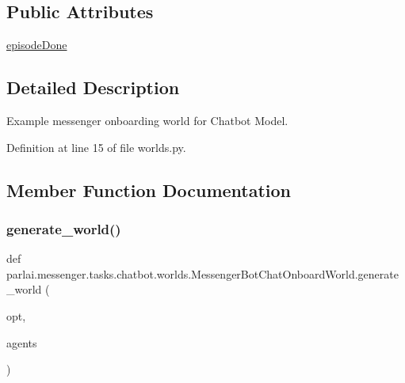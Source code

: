 \subsection*{Public Attributes}
\begin{DoxyCompactItemize}
\item 
\hyperlink{classparlai_1_1messenger_1_1tasks_1_1chatbot_1_1worlds_1_1MessengerBotChatOnboardWorld_ab096cda8cc21f3a5e7f812852e7c0af6}{episode\+Done}
\end{DoxyCompactItemize}


\subsection{Detailed Description}
\begin{DoxyVerb}Example messenger onboarding world for Chatbot Model.\end{DoxyVerb}
 

Definition at line 15 of file worlds.\+py.



\subsection{Member Function Documentation}
\mbox{\label{classparlai_1_1messenger_1_1tasks_1_1chatbot_1_1worlds_1_1MessengerBotChatOnboardWorld_ab2a2d31bff19f1347c0a90a17ca7390e}} 
\subsubsection{\texorpdfstring{generate\+\_\+world()}{generate\_world()}}
{\footnotesize\ttfamily def parlai.\+messenger.\+tasks.\+chatbot.\+worlds.\+Messenger\+Bot\+Chat\+Onboard\+World.\+generate\+\_\+world (\begin{DoxyParamCaption}\item[{}]{opt,  }\item[{}]{agents }\end{DoxyParamCaption})\hspace{0.3cm}{\ttfamily [static]}}



